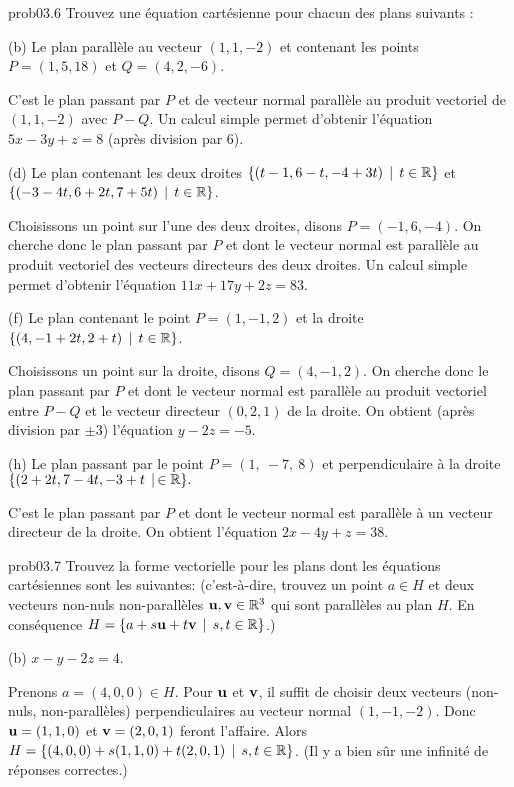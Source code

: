 \bigskip
\begin{sol}{prob03.6} Trouvez une équation cartésienne pour chacun des plans suivants :

\medskip

(b) Le plan parallèle au vecteur $(1, 1, -2)$ et contenant les points $P=(1, 5, 18)$ et $Q=(4, 2, -6)$. 

\soln C'est le plan passant par $P$ et de vecteur normal parallèle au produit vectoriel de $(1, 1, -2)$ avec $P-Q$. Un calcul simple permet d'obtenir l'équation $5x - 3y + z = 8$ (après division par 6).
\medskip

 

(d) Le plan contenant les deux droites 
$\{(t-1,6-t,-4+3t)\, \mid \, t \in \mathbb{R}\}$ et 
 $ \{(-3 -4t, 6+ 2t, 7+5t)\, \mid \, t \in \mathbb{R}\}$.  \medskip  

\soln Choisissons un point sur l'une des deux droites, disons $P=(-1,6,-4)$. On cherche donc le plan passant par $P$ et dont le vecteur normal est parallèle au produit vectoriel des vecteurs directeurs des deux droites. Un calcul simple permet d'obtenir l'équation $11x + 17y + 2z = 83$.


 
\medskip
(f) Le plan contenant le point $P=(1, -1, 2)$ et la droite  $\{(4, -1 + 2t,2 + t)\, \mid \, t \in \mathbb{R}\}$. \medskip

\soln Choisissons un point sur la droite, disons $Q=(4,-1,2)$. On cherche donc le plan passant par $P$ et dont le vecteur normal est parallèle au produit vectoriel entre $P-Q$ et le vecteur directeur $(0,2,1)$ de la droite. On obtient (après division par $\pm3$) l'équation $y - 2z =- 5$.\medskip


 

(h)  Le plan passant par le point $P=(1,\ -7,\ 8)$ et perpendiculaire à la droite $\{(2+2t,7-4t,-3+t\, \mid \,\in \mathbb{R}\}.$ \smallskip   

\soln C'est le plan passant par $P$ et dont le vecteur normal est parallèle à un vecteur directeur de la droite. On obtient l'équation $2x-4y+z=38$.\medskip  

\end{sol}


\bigskip
 \begin{sol}{prob03.7} Trouvez la forme vectorielle pour les plans dont les équations cartésiennes sont les suivantes:  
(c'est-à-dire, trouvez un point $a \in H$ et deux vecteurs non-nuls non-parallèles $\mathbf{u}, \mathbf{v} \in \mathbb{R}^3$ qui sont parallèles au plan $H$. En cons\'equence $H=\{a+ s \mathbf{u} + t \mathbf{v}\, \mid \, s,t \in \mathbb{R}\}$.)\medskip

(b) $x - y - 2z = 4$. 

\soln Prenons $a=(4,0,0) \in H$. Pour $\mathbf{u}$ et $\mathbf{v}$, il suffit de choisir deux vecteurs (non-nuls, non-parallèles) perpendiculaires au vecteur normal $(1,-1,-2)$. Donc $\mathbf{u}= (1,1,0)$ et $\mathbf{v}=(2,0,1)$ feront l'affaire. Alors $H=\{(4,0,0)+ s (1,1,0) + t (2,0,1)\, \mid \, s,t \in \mathbb{R}\}$. (Il y a bien sûr une infinité de réponses correctes.)\medskip


\end{sol} 

